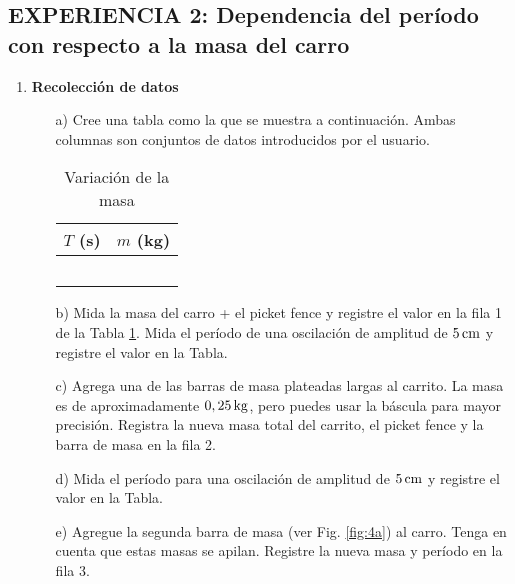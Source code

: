 \documentclass[9pt,a4paper,twocolumn,twoside]{tau-class/tau}
\begin{document}
\subsection{EXPERIENCIA 2: Dependencia  del  período  con  respecto  a  la  masa  del  carro}
    \begin{enumerate}
        \item \textbf{Recolección de datos}
             \begin{itemize}
                \item [a)]   Cree  una  tabla  como  la  que  se  muestra  a  continuación.  Ambas  columnas  son  conjuntos  de  datos  introducidos  por  el  usuario.
                \begin{table}[htbp]
                    \centering
                    \begin{tabular}{|c|c|}
                    \hline
                         $T$ (s) & $m$ (kg)  \\\hline
                         & \\\hline
                         & \\\hline
                         & \\\hline
                         & \\\hline
                         & \\\hline
                    \end{tabular}
                    \caption{Variación de la masa}
                    \label{tab:01}
                \end{table}
                \item [b)]   Mida  la  masa  del  carro  +  el picket fence  y  registre  el  valor  en  la  fila  1  de  la  Tabla  \textcolor{blue}{\ref{tab:01}}. Mida  el  período  de  una  oscilación  de  amplitud  de  $5\,\rm  cm$  y  registre  el  valor  en  la  Tabla.
                \item [c)]  Agrega  una  de  las  barras  de  masa  plateadas  largas  al  carrito.  La  masa  es  de  aproximadamente  $0,25\,\rm  kg$,  pero  puedes  usar  la  báscula  para  mayor  precisión.  Registra  la  nueva  masa  total  del  carrito,  el picket fence  y  la  barra  de  masa  en  la  fila  2.
                \item [d)]   Mida  el  período  para  una  oscilación  de  amplitud  de  $5\,\rm  cm$  y  registre  el  valor  en  la  Tabla.
                \item [e)]  Agregue  la  segunda  barra  de  masa  (ver  Fig.  \textcolor{blue}{\ref{fig:4a}})  al  carro.  Tenga  en  cuenta  que  estas  masas  se  apilan.  Registre la nueva  masa  y  período  en  la  fila  3.

\end{itemize}
\end{enumerate}
\end{document}
